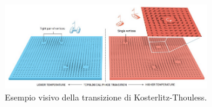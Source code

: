 \begin{figure}[H]
    \centering
    \includegraphics[width=0.8\textwidth]{Immagini/riass1_KT.png}
    \caption{Esempio visivo della transizione di Kosterlitz-Thouless.}
    \label{fig: riass_KT1}
\end{figure}
